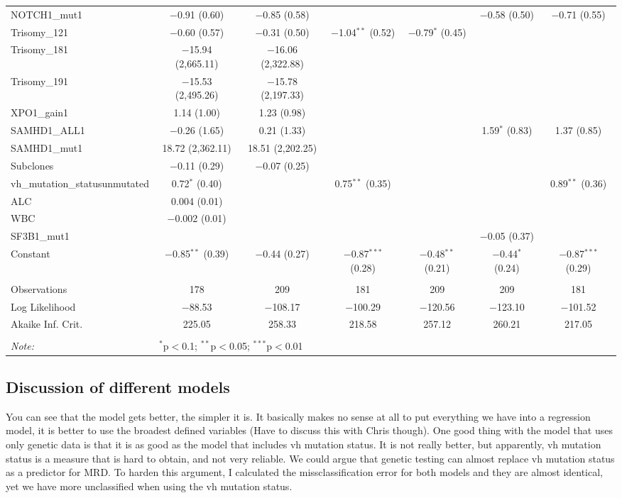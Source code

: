 \documentclass[a4paper,11pt]{article}
\begin{document}
\begin{table}[!htbp]
\begin{tabular}{@{\extracolsep{5pt}}lcccccc}
  NOTCH1\_mut1 & $-$0.91 (0.60) & $-$0.85 (0.58) &  &  & $-$0.58 (0.50) & $-$0.71 (0.55) \\ 
  Trisomy\_121 & $-$0.60 (0.57) & $-$0.31 (0.50) & $-$1.04$^{**}$ (0.52) & $-$0.79$^{*}$ (0.45) &  &  \\ 
  Trisomy\_181 & $-$15.94 (2,665.11) & $-$16.06 (2,322.88) &  &  &  &  \\ 
  Trisomy\_191 & $-$15.53 (2,495.26) & $-$15.78 (2,197.33) &  &  &  &  \\ 
  XPO1\_gain1 & 1.14 (1.00) & 1.23 (0.98) &  &  &  &  \\ 
  SAMHD1\_ALL1 & $-$0.26 (1.65) & 0.21 (1.33) &  &  & 1.59$^{*}$ (0.83) & 1.37 (0.85) \\ 
  SAMHD1\_mut1 & 18.72 (2,362.11) & 18.51 (2,202.25) &  &  &  &  \\ 
  Subclones & $-$0.11 (0.29) & $-$0.07 (0.25) &  &  &  &  \\ 
  vh\_mutation\_statusunmutated & 0.72$^{*}$ (0.40) &  & 0.75$^{**}$ (0.35) &  &  & 0.89$^{**}$ (0.36) \\ 
  ALC & 0.004 (0.01) &  &  &  &  &  \\ 
  WBC & $-$0.002 (0.01) &  &  &  &  &  \\ 
  SF3B1\_mut1 &  &  &  &  & $-$0.05 (0.37) &  \\ 
  Constant & $-$0.85$^{**}$ (0.39) & $-$0.44 (0.27) & $-$0.87$^{***}$ (0.28) & $-$0.48$^{**}$ (0.21) & $-$0.44$^{*}$ (0.24) & $-$0.87$^{***}$ (0.29) \\ 
 \hline \\[-1.8ex] 
Observations & 178 & 209 & 181 & 209 & 209 & 181 \\ 
Log Likelihood & $-$88.53 & $-$108.17 & $-$100.29 & $-$120.56 & $-$123.10 & $-$101.52 \\ 
Akaike Inf. Crit. & 225.05 & 258.33 & 218.58 & 257.12 & 260.21 & 217.05 \\ 
\hline 
\hline \\[-1.8ex] 
\textit{Note:}  & \multicolumn{6}{l}{$^{*}$p$<$0.1; $^{**}$p$<$0.05; $^{***}$p$<$0.01} \\ 
\end{tabular} 
\end{table} %
\subsection*{Discussion of different models}
You can see that the model gets better, the simpler it is. It basically makes no sense at all to put everything we have into a regression model, it is better to use the broadest defined variables (Have to discuss this with Chris though). One good thing with the model that uses only genetic data is that it is as good as the model that includes vh mutation status. It is not really better, but apparently, vh mutation status is a measure that is hard to obtain, and not very reliable. We could argue that genetic testing can almost replace vh mutation status as a predictor for MRD. To harden this argument, I calculated the missclassification error for both models and they are almost identical, yet we have more unclassified when using the vh mutation status.
\end{document}
